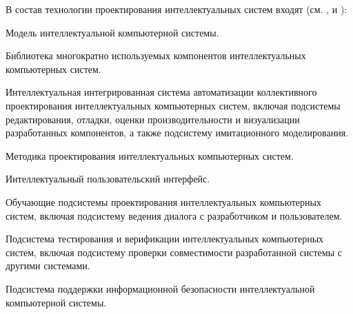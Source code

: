 \begin{partbacktext}
В состав технологии проектирования интеллектуальных систем входят (см. ,  и ):
\begin{textitemize}
	\item Модель интеллектуальной компьютерной системы.
	\item Библиотека многократно используемых компонентов интеллектуальных компьютерных систем.
	\item Интеллектуальная интегрированная система автоматизации коллективного проектирования интеллектуальных компьютерных систем, включая подсистемы редактирования, отладки, оценки производительности и визуализации разработанных компонентов, а также подсистему имитационного моделирования.
	\item Методика проектирования интеллектуальных компьютерных систем.
	\item Интеллектуальный пользовательский интерфейс.
	\item Обучающие подсистемы проектирования интеллектуальных компьютерных систем, включая подсистему ведения диалога с разработчиком и пользователем.
	\item Подсистема тестирования и верификации интеллектуальных компьютерных систем, включая подсистему проверки совместимости разработанной системы с другими системами.
	\item Подсистема поддержки информационной безопасности интеллектуальной компьютерной системы.
\end{textitemize}

\end{partbacktext}





